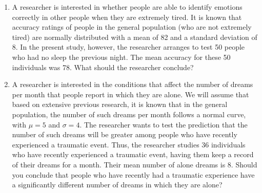 \documentclass[12pt]{article}%
\begin{document}
\mbox{}
\large
\begin{enumerate}

\item A researcher is interested in whether people are able to identify emotions correctly in other people when they are extremely tired.  It is known that accuracy ratings of people in the general population (who are not extremely tired) are normally distributed with a mean of 82 and a standard deviation of 8.  In the present study, however, the researcher arranges to test 50 people who had no sleep the previous night.  The mean accuracy for these 50 individuals was 78.  What should the researcher conclude?

\newpage

\item A researcher is interested in the conditions that affect the number of dreams per month that people report in which they are alone.  We will assume that based on extensive previous research, it is known that in the general population, the number of such dreams per month follows a normal curve, with $\mu=5$ and $\sigma=4$.  The researcher wants to test the prediction that the number of such dreams will be greater among people who have recently experienced a traumatic event.  Thus, the researcher studies 36 individuals who have recently experienced a traumatic event, having them keep a record of their dreams for a month.  Their mean number of alone dreams is 8.  Should you conclude that people who have recently had a traumatic experience have a significantly different number of dreams in which they are alone?


\end{enumerate}
\end{document}
